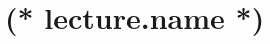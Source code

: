 \documentclass[12pt, twoside]{dgs}
\begin{document}
    \pagestyle{lecture}
    \section{(* lecture.name *)}
    
\end{document}
